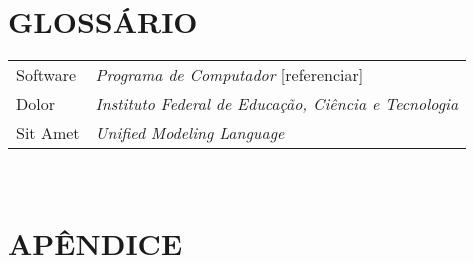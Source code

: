 \documentclass[12pt,a4paper]{article}
\begin{document}
	\printbibliography[heading=none]

	\newpage

	\section*{GLOSSÁRIO}

	\begin{tabular}{p{3cm} p{}}
	  Software & \textit{Programa de Computador} [referenciar] \\
	  Dolor & \textit{Instituto Federal de Educação, Ciência e Tecnologia} \\
	  Sit Amet & \textit{Unified Modeling Language} \\
	\end{tabular}\\


	\newpage

	\section*{APÊNDICE}

	\lipsum[1]

	\newpage
\end{document}
